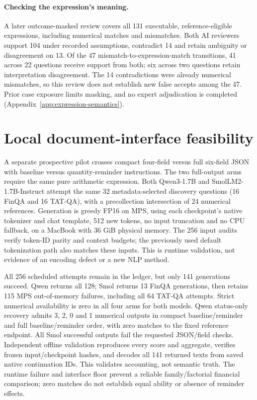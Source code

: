 \paragraph{Checking the expression's meaning.} A later outcome-masked review covers all 131 executable, reference-eligible expressions, including numerical matches and mismatches. Both AI reviewers support 104 under recorded assumptions, contradict 14 and retain ambiguity or disagreement on 13. Of the 47 mismatch-to-expression-match transitions, 41 across 22 questions receive support from both; six across two questions retain interpretation disagreement. The 14 contradictions were already numerical mismatches, so this review does not establish new false accepts among the 47. Prior case exposure limits masking, and no expert adjudication is completed (Appendix~\ref{app:expression-semantics}).

\section{Local document-interface feasibility}\label{app:local-interface}
A separate prospective pilot crosses compact four-field versus full six-field JSON with baseline versus quantity-reminder instructions. The two full-output arms require the same pure arithmetic expression. Both Qwen3-1.7B and SmolLM2-1.7B-Instruct attempt the same 32 metadata-selected discovery questions (16 FinQA and 16 TAT-QA), with a precollection intersection of 24 numerical references. Generation is greedy FP16 on MPS, using each checkpoint's native tokenizer and chat template, 512 new tokens, no input truncation and no CPU fallback, on a MacBook with 36 GiB physical memory. The 256 input audits verify token-ID parity and context budgets; the previously used default tokenization path also matches these inputs. This is runtime validation, not evidence of an encoding defect or a new NLP method.

All 256 scheduled attempts remain in the ledger, but only 141 generations succeed. Qwen returns all 128; Smol returns 13 FinQA generations, then retains 115 MPS out-of-memory failures, including all 64 TAT-QA attempts. Strict numerical availability is zero in all four arms for both models. Qwen status-only recovery admits 3, 2, 0 and 1 numerical outputs in compact baseline/reminder and full baseline/reminder order, with zero matches to the fixed reference endpoint. All Smol successful outputs fail the requested JSON/field checks. Independent offline validation reproduces every score and aggregate, verifies frozen input/checkpoint hashes, and decodes all 141 returned texts from saved native continuation IDs. This validates accounting, not semantic truth. The runtime failure and interface floor prevent a reliable family/factorial financial comparison; zero matches do not establish equal ability or absence of reminder effects.

